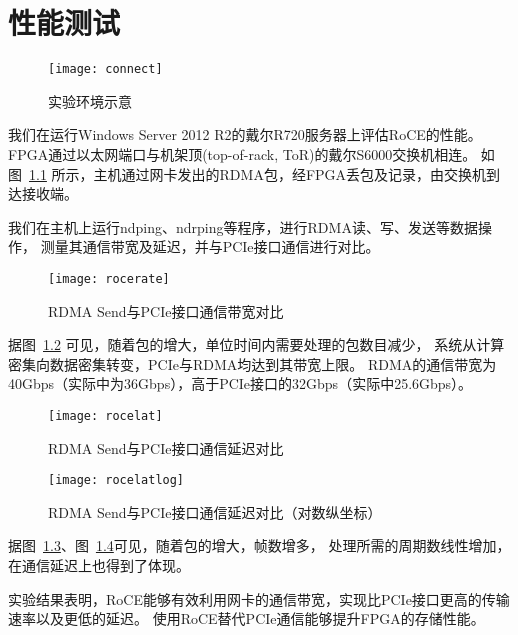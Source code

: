 \chapter{性能测试}
\begin{figure}[htbp]
\centering
\texttt{[image: connect]}
\caption{实验环境示意} \label{fig:connect}
\end{figure}
我们在运行Windows Server 2012 R2的戴尔R720服务器上评估RoCE的性能。
FPGA通过以太网端口与机架顶(top-of-rack, ToR)的戴尔S6000交换机\cite{s6000}相连。
如图~\ref{fig:connect} 所示，主机通过网卡发出的RDMA包，经FPGA丢包及记录，由交换机到达接收端。

我们在主机上运行ndping、ndrping等程序，进行RDMA读、写、发送等数据操作，
测量其通信带宽及延迟，并与PCIe接口通信进行对比。

\begin{figure}[htbp]
\centering
\texttt{[image: rocerate]}
\caption{RDMA Send与PCIe接口通信带宽对比} \label{fig:rocerate}
\end{figure}

据图~\ref{fig:rocerate} 可见，随着包的增大，单位时间内需要处理的包数目减少，
系统从计算密集向数据密集转变，PCIe与RDMA均达到其带宽上限。
RDMA的通信带宽为40Gbps（实际中为36Gbps），高于PCIe接口的32Gbps（实际中25.6Gbps）。

\begin{figure}[htbp]
\centering
\texttt{[image: rocelat]}
\caption{RDMA Send与PCIe接口通信延迟对比} \label{fig:rocelat}
\end{figure}

\begin{figure}[htbp]
\centering
\texttt{[image: rocelatlog]}
\caption{RDMA Send与PCIe接口通信延迟对比（对数纵坐标）} \label{fig:rocelatlog}
\end{figure}

据图~\ref{fig:rocelat}、图~\ref{fig:rocelatlog}可见，随着包的增大，帧数增多，
处理所需的周期数线性增加，在通信延迟上也得到了体现。

实验结果表明，RoCE能够有效利用网卡的通信带宽，实现比PCIe接口更高的传输速率以及更低的延迟。
使用RoCE替代PCIe通信能够提升FPGA的存储性能。
